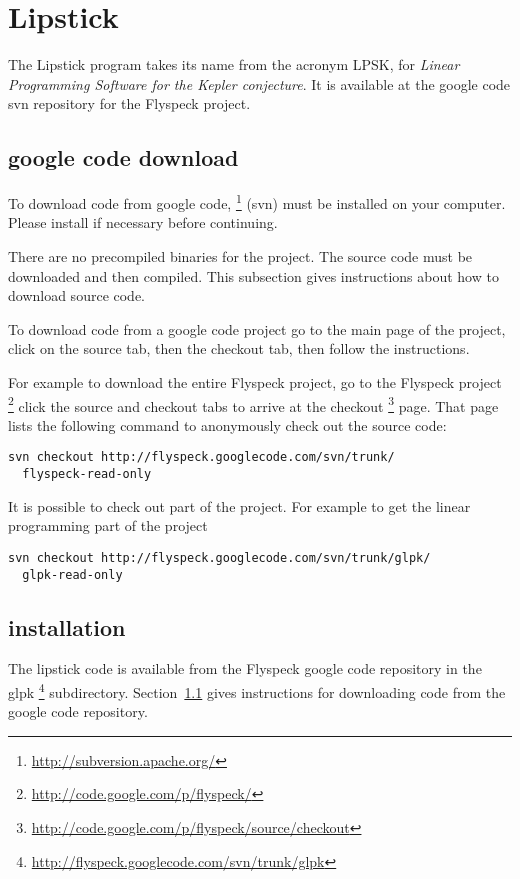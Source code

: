 \section{Lipstick}

The Lipstick program takes its name from the acronym LPSK, for
{\it Linear Programming Software for the Kepler conjecture}.  It is available
at the google code svn repository for the Flyspeck project.


\subsection{google code download}\label{sec:google-code}

To download code from google code, \footnote{\url{http://subversion.apache.org/}} (svn) must be
installed on your computer.  Please install if necessary before continuing.

There are no precompiled binaries for the project.  The source code
must be downloaded and then compiled.  This subsection gives
instructions about how to download source code.

To download code from a google code project go to the main page of the
project, click on the source tab, then the checkout tab, then follow
the instructions.

For example to download the entire Flyspeck project, go to
the Flyspeck project%
\footnote{\url{http://code.google.com/p/flyspeck/}} %
click the source and
checkout tabs to arrive at the checkout%
\footnote{\url{http://code.google.com/p/flyspeck/source/checkout}} %
 page.
That page
lists the following command to anonymously check out the source code:
\begin{verbatim}
svn checkout http://flyspeck.googlecode.com/svn/trunk/ 
  flyspeck-read-only
\end{verbatim}

It is possible to check out part of the project.  For example to get
the linear programming part of the project
\begin{verbatim}
svn checkout http://flyspeck.googlecode.com/svn/trunk/glpk/ 
  glpk-read-only
\end{verbatim}

\subsection{installation}

The lipstick code is available from the Flyspeck google code repository in
the glpk%
\footnote{\url{http://flyspeck.googlecode.com/svn/trunk/glpk}} %
 subdirectory.  Section~\ref{sec:google-code}
gives instructions for downloading code from the google code repository.

